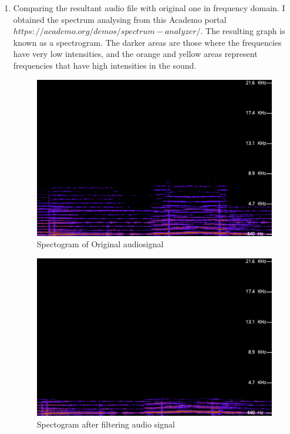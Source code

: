 \documentclass[journal,12pt,twocolumn]{IEEEtran}
\theoremstyle{remark}
\begin{document}
\begin{enumerate}[label=\thesection.\arabic*
,ref=\thesection.\theenumi]
\item Comparing the resultant audio file with original one in frequency domain.
I obtained the spectrum analysing from this Academo portal $https://academo.org/demos/spectrum-analyzer/$.  The resulting graph is known as a spectrogram. The darker areas are those where the frequencies have very low intensities, and the orange and yellow areas represent frequencies that have high intensities in the sound.
\begin{figure}[ht]
    \centering  
\includegraphics[width=\columnwidth]{figs/originalaudio.png}
\caption{Spectogram of Original audiosignal}
\end{figure}
\begin{figure}[ht]
    \centering  
\includegraphics[width=\columnwidth]{figs/filteredaudio.png}
\caption{Spectogram after filtering audio signal}
\end{figure}
\begin{enumerate}[label=\thesection.\arabic*
,ref=\thesection.\theenumi]

\end{enumerate}
\end{enumerate}
\end{document}
